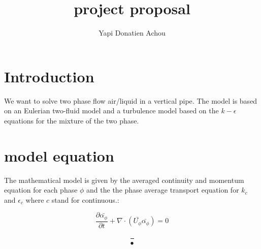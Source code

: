 \documentclass[10pt,a4paper]{report}
\begin{document}
\author{Yapi Donatien Achou}
\title{project proposal}

\section{Introduction}
We want to solve two phase flow air/liquid in a vertical pipe. The model is based on an Eulerian two-fluid model and a turbulence model based on the $k-\epsilon$ equations for the mixture of the two phase.

\section{model equation }
The mathematical model is given by the averaged continuity and momentum equation for each phase $\phi$ and the the phase average transport equation for $k_{c}$ and $\epsilon_{c}$ where $c$ stand for continuous.:

\begin{equation}\label{ce}
\frac{\partial \bar{\alpha_{\phi}}}{\partial t}+\nabla\cdot(\bar{U_{\phi}}\bar{\alpha_{\phi}}) = 0
\end{equation}

\begin{equation}
\frac{ }{•}
\end{equation} 
\end{document}
